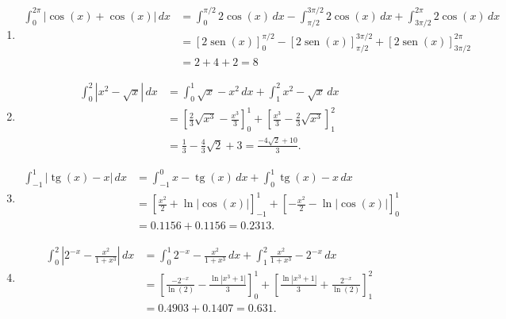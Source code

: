 \documentclass[
  spanish,
  a4paper,
]{scrreport}
\theoremstyle{definition}
\theoremstyle{remark}
\begin{document}
\begin{tcolorbox}[enhanced jigsaw, arc=.35mm, bottomrule=.15mm, bottomtitle=1mm, breakable, colback=white, colbacktitle=quarto-callout-tip-color!10!white, colframe=quarto-callout-tip-color-frame, coltitle=black, left=2mm, leftrule=.75mm, opacityback=0, opacitybacktitle=0.6, rightrule=.15mm, title=\textcolor{quarto-callout-tip-color}{\faLightbulb}\hspace{0.5em}{Solución}, titlerule=0mm, toprule=.15mm, toptitle=1mm]

\begin{enumerate}
\def\labelenumi{\alph{enumi}.}
\item
  \begin{align*}
   \int_0^{2\pi} |\cos(x)+\cos(x)|\,dx 
   &= \int_0^{\pi/2} 2\cos(x)\,dx - \int_{\pi/2}^{3\pi/2} 2\cos(x)\,dx +\int_{3\pi/2}^{2\pi} 2\cos(x)\,dx\\
   &= \left[2\operatorname{sen}(x)\right]_{0}^{\pi/2} - \left[2\operatorname{sen}(x)\right]_{\pi/2}^{3\pi/2} + \left[2\operatorname{sen}(x)\right]_{3\pi/2}^{2\pi}\\
   &= 2 +4 + 2 = 8
   \end{align*}
\item
  \begin{align*}
    \int_0^2 |x^2-\sqrt{x}|\,dx 
    &= \int_{0}^1 \sqrt{x}-x^2\,dx + \int_1^2 x^2-\sqrt{x}\,dx \\
    &= \left[\frac{2}{3}\sqrt{x^3}-\frac{x^3}{3}\right]_0^1 + \left[\frac{x^3}{3}-\frac{2}{3}\sqrt{x^3}\right]_1^2 \\ 
    &= \frac{1}{3}-\frac{4}{3}\sqrt{2}+3 = \frac{-4\sqrt{2}+10}{3}.
    \end{align*}
\item
  \begin{align*}
   \int_{-1}^1 |\operatorname{tg}(x)-x|\,dx 
   &= \int_{-1}^0 x-\operatorname{tg}(x)\,dx + \int_0^1 \operatorname{tg}(x)-x\,dx \\
   &= \left[\frac{x^2}{2}+\ln|\cos(x)|\right]_{-1}^1 + \left[-\frac{x^2}{2}-\ln|\cos(x)|\right]_0^1 \\ 
   &= 0.1156 + 0.1156 = 0.2313.
   \end{align*}
\item
  \begin{align*}
   \int_0^2 \left|2^{-x}-\frac{x^2}{1+x^3}\right|\,dx 
   &= \int_0^1 2^{-x}-\frac{x^2}{1+x^3}\,dx + \int_1^2 \frac{x^2}{1+x^3}-2^{-x}\,dx\\
   &= \left[\frac{-2^{-x}}{\ln(2)}-\frac{\ln|x^3+1|}{3}\right]_0^1 + \left[\frac{\ln|x^3+1|}{3}+\frac{2^{-x}}{\ln(2)}\right]_1^2 \\
   &= 0.4903 + 0.1407 = 0.631.
   \end{align*}
\end{enumerate}

\end{tcolorbox}
\end{document}
